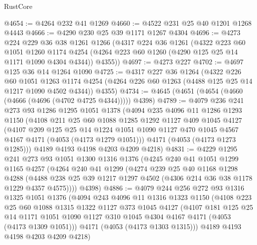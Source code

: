 \begin{lexlean}{RustCore}
\begin{coremodule}
@4654 := @4264 @232 @41 @1269
@4660 := @4522 @231 @25 @40 @1201 @1268 @4443
@4666 := @4290 @230 @25 @39 @1171 @1267 @4304
@4696 := @4273
    @224
    @229
    @36
    @38
    @1261
    @1266
    (@4317
      @224
      @36
      @1261
      (@4322
        @223
        @60
        @1051
        @1260
        @1174
        @4254
        (@4264 @223 @60 @1260 (@4290 @125 @25 @14 @1171 @1090 @4304 @4344))
        @4355))
@4697 := @4273 @227
@4702 := @4697 @125 @36 @14 @1264 @1090
@4725 := @4317
    @227
    @36
    @1264
    (@4322
      @226
      @60
      @1051
      @1263
      @1174
      @4254
      (@4264 @226 @60 @1263 (@4488 @125 @25 @14 @1217 @1090 @4502 @4344))
      @4355)
@4734 := @4645 (@4651 (@4654 (@4660 (@4666 (@4696 (@4702 @4725 @4344))))) @4398)
@4789 := @4079
    @236
    @241
    @273
    @93
    @1286
    @1295
    @1051
    @1378
    (@4094
      @235
      @4096
      @11
      @1286
      @1293
      @1150
      (@4108
        @211
        @25
        @60
        @1088
        @1285
        @1292
        @1127
        @409
        @1045
        @4127
        (@4107
          @209
          @125
          @25
          @14
          @1224
          @1051
          @1090
          @1127
          @470
          @1045
          @4567
          @4167
          @4171
          (@4053 (@4173 @1279 @1051)))
        @4171
        (@4053 (@4173 @1273 @1285)))
      @4189
      @4193
      @4198
      @4203
      @4209
      @4218)
@4831 := @4229
    @1295
    @241
    @273
    @93
    @1051
    @1300
    @1316
    @1376
    (@4245
      @240
      @41
      @1051
      @1299
      @1165
      @4257
      (@4264
        @240
        @41
        @1299
        (@4274
          @239
          @25
          @40
          @1168
          @1298
          @4288
          (@4488 @238 @25 @39 @1217 @1297 @4502 (@4306 @214 @36 @38 @1178 @1229 @4357 @4575))))
      @4398)
@4886 := @4079
    @244
    @256
    @272
    @93
    @1316
    @1325
    @1051
    @1376
    (@4094
      @243
      @4096
      @11
      @1316
      @1323
      @1150
      (@4108
        @223
        @25
        @60
        @1088
        @1315
        @1322
        @1127
        @373
        @1045
        @4127
        (@4107
          @181
          @125
          @25
          @14
          @1171
          @1051
          @1090
          @1127
          @310
          @1045
          @4304
          @4167
          @4171
          (@4053 (@4173 @1309 @1051)))
        @4171
        (@4053 (@4173 @1303 @1315)))
      @4189
      @4193
      @4198
      @4203
      @4209
      @4218)

\end{coremodule}
\end{lexlean}
